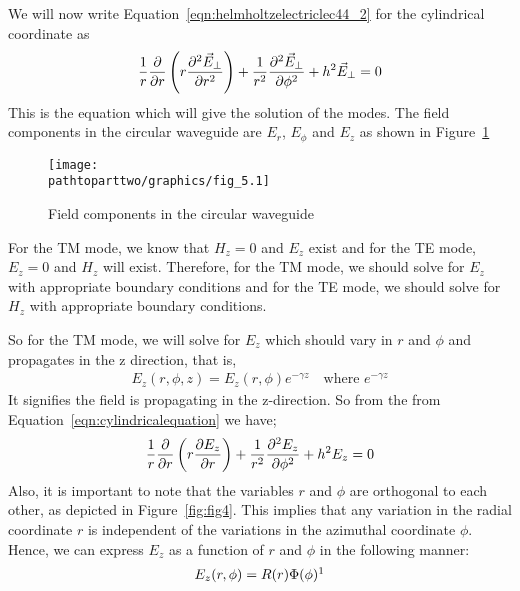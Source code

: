 We will now write Equation~\ref{eqn:helmholtzelectriclec44_2} for the cylindrical coordinate as 
\begin{align}
\frac{1}{r}\partialderivative{}{r}\left(r\partialderivative[2]{\vec{E}_\bot}{r}\right) + \frac{1}{r^2}\partialderivative[2]{\vec{E}_\bot}{\phi}+ h^2\vec{E}_\bot = 0 
\label{eqn:cylindricalequation}   
\end{align}
This is the equation which will give the solution of the modes. The field components in the circular waveguide are $E_r$, $E_\phi$ and $E_z$ as shown in Figure~\ref{fig:fig5}
\begin{figure}[h]
\centering
\texttt{[image: \\pathtoparttwo/graphics/fig\_5.1]}
\caption{Field components in the circular waveguide}
\label{fig:fig5}
\end{figure}

For the TM mode, we know that $H_z=0$ and $E_z$ exist and for the TE mode, $E_z=0$ and $H_z$ will exist. Therefore, for the TM mode, we should solve for $E_z$ with appropriate boundary conditions and for the TE mode, we should solve for $H_z$ with appropriate boundary conditions. 

So for the TM mode, we will solve for $E_z$ which should vary in $r$ and $\phi$ and propagates in the z direction, that is,
\begin{align*}
E_z(r,\phi, z)=E_z(r,\phi)e^{-\gamma z}\quad\text{where }e^{-\gamma z}
\end{align*}
It signifies the field is propagating in the z-direction. So from the from Equation~\eqref{eqn:cylindricalequation} we have;
\begin{equation}
\frac{1}{r}\partialderivative{}{r}\left(r\partialderivative{E_z}{r}\right) + \frac{1}{r^2}\partialderivative[2]{E_z}{\phi} + h^2 E_z = 0 
\label{eqn:pdecircularwaveguide}
\end{equation}
Also, it is important to note that the variables $r$ and $\phi$ are orthogonal to each other, as depicted in Figure~\ref{fig:fig4}. This implies that any variation in the radial coordinate $r$ is independent of the variations in the azimuthal coordinate $\phi$. Hence, we can express $E_z$ as a function of $r$ and $\phi$ in the following manner:
\begin{align*}
E_z(r, \phi) = R(r)\Phi(\phi)\footnotemark
\end{align*}

